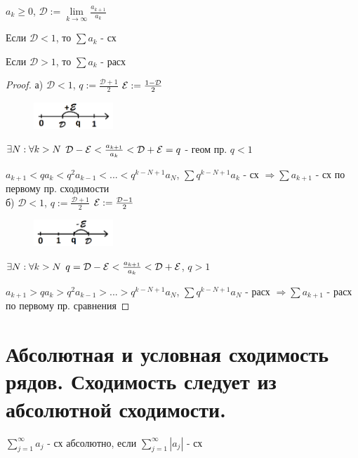 \documentclass[matan]{subfiles}
\begin{document}
  \begin{theorem} 
      $a_k \geqslant 0$, $\mathcal{D}:=\lim\limits_{k \rightarrow \infty} \frac{a_{k+1}}{a_k}$

      Если $\mathcal{D} < 1$, то $\sum a_k$ - сх

      Если $\mathcal{D} > 1$, то $\sum a_k$ - расх
  \end{theorem}

  \begin{proof}
      а) $\mathcal{D} < 1$, $q := \frac{\mathcal{D} + 1}{2}$ $\mathcal{E} := \frac{1 - \mathcal{D}}{2}$
      \begin{figure}[H]
          \centering
          \includegraphics[width=3cm]{pics/17_3}
      \end{figure}
      $\exists N: \forall k>N$ $\mathcal{D}-\mathcal{E} < \frac{a_{k+1}}{a_k} < \mathcal{D}+\mathcal{E} = q$ - геом пр. $q < 1$

      $a_{k+1} < q a_k < q^2 a_{k-1} < ... < q^{k-N+1} a_N$, $\sum q^{k-N+1} a_k$ - сх $\Rightarrow \sum a_{k+1}$ - сх по первому пр. сходимости
      \\
      б) $\mathcal{D} < 1$, $q := \frac{\mathcal{D} + 1}{2}$ $\mathcal{E} := \frac{\mathcal{D} - 1}{2}$
      \begin{figure}[H]
          \centering
          \includegraphics[width=3cm]{pics/17_4}
      \end{figure}
      $\exists N: \forall k>N$ $q = \mathcal{D}-\mathcal{E} < \frac{a_{k+1}}{a_k} < \mathcal{D}+\mathcal{E}$, $q > 1$

      $a_{k+1}> q a_k > q^2 a_{k-1} > ... >q^{k-N+1} a_N$, $\sum q^{k-N+1} a_N$ - расх $\Rightarrow \sum a_{k+1}$ - расх по первому пр. сравнения
  \end{proof}

  \newpage
  \section{Абсолютная и условная сходимость рядов. Сходимость следует из абсолютной сходимости.}
  \hypertarget{q18}{}

  \begin{definition}
      $\sum\limits_{j=1}^\infty a_j$ - сх абсолютно, если $\sum\limits_{j=1}^\infty |a_j|$ - сх
  \end{definition}
\end{document}
